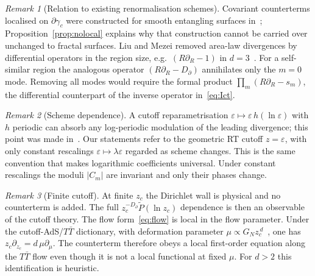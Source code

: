 \documentclass[11pt]{article}
\theoremstyle{definition}\newtheorem{definition}{Definition}[section]
\theoremstyle{remark}\newtheorem*{remark}{Remark}
\newcommand{\GN}{G_N}
\begin{document}
\begin{remark}[Relation to existing renormalisation schemes]
Covariant counterterms localised on $\partial\gamma_c$ were constructed for smooth entangling surfaces
in~\cite{TaylorWoodhead}; Proposition~\ref{prop:nolocal} explains why that construction cannot be
carried over unchanged to fractal surfaces. Liu and Mezei removed area-law divergences by differential
operators in the region size, e.g.\ $(R\partial_R-1)$ in $d=3$~\cite{LiuMezei}. For a self-similar region
the analogous operator $(R\partial_R-D_\partial)$ annihilates only the $m=0$ mode. Removing all modes would
require the formal product $\prod_m(R\partial_R-s_m)$, the differential counterpart of the inverse operator
in~\eqref{eq:Ict}.
\end{remark}

\begin{remark}[Scheme dependence]
A cutoff reparametrisation $\varepsilon\mapsto\varepsilon\,h(\ln\varepsilon)$ with $h$ periodic can absorb any
log-periodic modulation of the leading divergence; this point was made in~\cite{FarajiAstaneh}. Our
statements refer to the geometric RT cutoff $z=\varepsilon$, with only constant rescalings
$\varepsilon\mapsto\lambda\varepsilon$ regarded as scheme changes. This is the same convention that makes
logarithmic coefficients universal. Under constant rescalings the moduli $|C_m|$ are invariant and only their
phases change.
\end{remark}

\begin{remark}[Finite cutoff]
At finite $z_c$ the Dirichlet wall is physical and no counterterm is added. The full
$z_c^{-D_\partial}\tilde P(\ln z_c)$ dependence is then an observable of the cutoff theory. The flow
form~\eqref{eq:flow} is local in the flow parameter. Under the cutoff-AdS/$T\bar T$ dictionary, with deformation
parameter $\mu\propto\GN z_c^{\,d}$~\cite{MMV,HKST}, one has $z_c\partial_{z_c}=d\,\mu\partial_\mu$. The
counterterm therefore obeys a local first-order equation along the $T\bar T$ flow even though it is not a
local functional at fixed $\mu$. For $d>2$ this identification is heuristic.
\end{remark}
\end{document}
